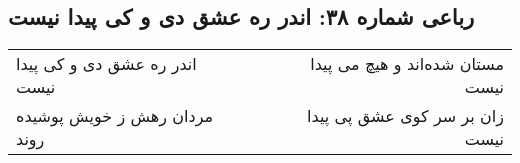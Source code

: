 \begin{center}
\section*{رباعی شماره ۳۸: اندر ره عشق دی و کی پیدا نیست}
\label{sec:038}
\begin{longtable}{l p{0.5cm} r}
اندر ره عشق دی و کی پیدا نیست
&&
مستان شده‌اند و هیچ می پیدا نیست
\\
مردان رهش ز خویش پوشیده روند
&&
زان بر سر کوی عشق پی پیدا نیست
\\
\end{longtable}
\end{center}
